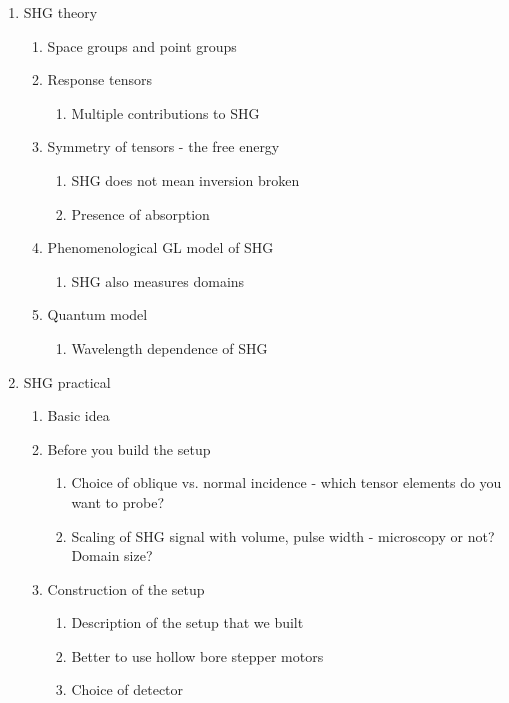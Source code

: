 \documentclass{article}
\begin{document}
\begin{enumerate}
\item SHG theory
    \begin{enumerate}
    \item Space groups and point groups
    \item Response tensors
        \begin{enumerate}
        \item Multiple contributions to SHG
        \end{enumerate}
    \item Symmetry of tensors - the free energy
        \begin{enumerate}
        \item SHG does not mean inversion broken
        \item Presence of absorption
        \end{enumerate}
    \item Phenomenological GL model of SHG
        \begin{enumerate}
        \item SHG also measures domains
        \end{enumerate}
    \item Quantum model
        \begin{enumerate}
        \item Wavelength dependence of SHG
        \end{enumerate}
    \end{enumerate}
\item SHG practical
    \begin{enumerate}
    \item Basic idea
    \item Before you build the setup
        \begin{enumerate}
        \item Choice of oblique vs. normal incidence - which tensor elements do you want to probe?
        \item Scaling of SHG signal with volume, pulse width - microscopy or not? Domain size?
        \end{enumerate}
    \item Construction of the setup
        \begin{enumerate}
        \item Description of the setup that we built
        \item Better to use hollow bore stepper motors
        \item Choice of detector
        \end{enumerate}

\end{enumerate}
\end{enumerate}
\end{document}
